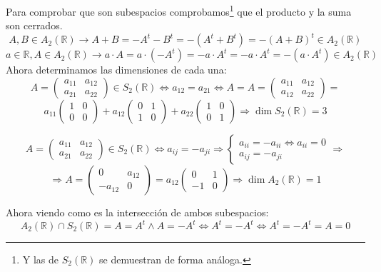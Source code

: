\documentclass[10pt,a4paper,openright]{book}
\begin{document}
Para comprobar que son subespacios comprobamos\footnote{Y las de $S_2(\mathbb R)$ se demuestran de forma análoga.} que el producto y la suma son cerrados.
$$A,B\in A_2(\mathbb R)\rightarrow A+B=-A^t-B^t=-(A^t+B^t)=-(A+B)^t\in A_2(\mathbb R)$$
$$a\in \mathbb R, A\in A_2(\mathbb R)\rightarrow a\cdot A=a\cdot (-A^t)=-a\cdot A^t=-a\cdot A^t=-(a\cdot A^t)\in A_2(\mathbb R)$$
Ahora determinamos las dimensiones de cada una:
$$A=\left(\begin{array}{cc}a_{11}&a_{12}\\ a_{21}&a_{22}\end{array}\right)\in S_2(\mathbb R)\Leftrightarrow a_{12}=a_{21}\Leftrightarrow A=A=\left(\begin{array}{cc}a_{11}&a_{12}\\ a_{12}&a_{22}\end{array}\right)=$$
$$a_{11}\left(\begin{array}{cc}1&0\\ 0&0\end{array}\right)+ a_{12}\left(\begin{array}{cc}0&1\\ 1&0\end{array}\right)+a_{22} \left(\begin{array}{cc}1&0\\ 0&1\end{array}\right)\Rightarrow \dim S_2(\mathbb R)=3$$

$$A=\left(\begin{array}{cc}a_{11}&a_{12}\\ a_{21}&a_{22}\end{array}\right)\in S_2(\mathbb R)\Leftrightarrow a_{ij}=-a_{ji}\Rightarrow
\begin{cases}
a_{ii}=-a_{ii}\Leftrightarrow a_{ii}=0 \\
a_{ij}=-a_{ji}
\end{cases}\Rightarrow$$
$$\Rightarrow A=\left(\begin{array}{cc}0&a_{12}\\ -a_{12}&0\end{array}\right)=a_{12}\left(\begin{array}{cc}0&1\\ -1&0\end{array}\right)\Rightarrow \dim A_2(\mathbb R)=1$$

Ahora viendo como es la intersección de ambos subespacios:
$$A_2(\mathbb R)\cap S_2(\mathbb R)=A=A^t\wedge A=-A^t\Leftrightarrow A^t=-A^t\Leftrightarrow A^t=-A^t=A=0$$
\end{document}
